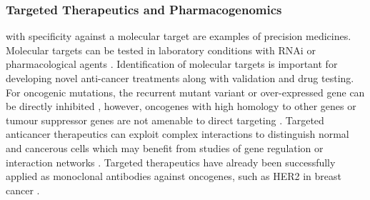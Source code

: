 \subsubsection{Targeted Therapeutics and Pharmacogenomics}
 with specificity against a molecular target are examples of \glspl{precision medicine}. Molecular targets can be tested in laboratory conditions with \gls{RNAi} or pharmacological agents \citep{Fece2015}. Identification of molecular targets is important for developing novel anti-cancer \glspl{treatment} along with validation and drug testing. For oncogenic \glspl{mutation}, the recurrent \gls{mutant} variant or over-expressed gene can be directly inhibited%
, however, \glspl{oncogene} with high homology to other genes or \gls{tumour suppressor} genes are not amenable to direct targeting \citep{Kaelin2009}.
%
Targeted anticancer therapeutics can exploit complex interactions to distinguish normal and cancerous cells which may benefit from studies of gene regulation or interaction networks \citep{Hopkins2008}.
%
%
Targeted therapeutics have already been successfully applied as monoclonal antibodies against \glspl{oncogene}, such as HER2 in breast cancer \citep{Miles2001}. %
%
%

